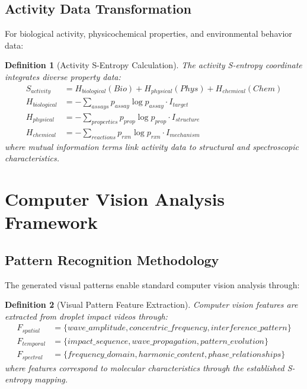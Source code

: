\documentclass[12pt,a4paper]{article}
\newtheorem{definition}{Definition}
\begin{document}
\subsection{Activity Data Transformation}

For biological activity, physicochemical properties, and environmental behavior data:

\begin{definition}[Activity S-Entropy Calculation]
The activity S-entropy coordinate integrates diverse property data:
\begin{align}
S_{activity} &= H_{biological}(Bio) + H_{physical}(Phys) + H_{chemical}(Chem) \\
H_{biological} &= -\sum_{assays} p_{assay} \log p_{assay} \cdot I_{target} \\
H_{physical} &= -\sum_{properties} p_{prop} \log p_{prop} \cdot I_{structure} \\
H_{chemical} &= -\sum_{reactions} p_{rxn} \log p_{rxn} \cdot I_{mechanism}
\end{align}
where mutual information terms link activity data to structural and spectroscopic characteristics.
\end{definition}

\section{Computer Vision Analysis Framework}

\subsection{Pattern Recognition Methodology}

The generated visual patterns enable standard computer vision analysis through:

\begin{definition}[Visual Pattern Feature Extraction]
Computer vision features are extracted from droplet impact videos through:
\begin{align}
F_{spatial} &= \{wave\_amplitude, concentric\_frequency, interference\_pattern\} \\
F_{temporal} &= \{impact\_sequence, wave\_propagation, pattern\_evolution\} \\
F_{spectral} &= \{frequency\_domain, harmonic\_content, phase\_relationships\}
\end{align}
where features correspond to molecular characteristics through the established S-entropy mapping.
\end{definition}
\end{document}
